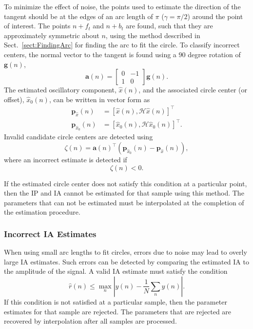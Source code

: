 \documentclass[a4paper]{IEEEtran}
\begin{document}
To minimize the effect of noise, the points used to estimate the direction of the tangent should be at the edges of an arc length of $\pi$ ($\gamma = \pi/2$) around the point of interest. The points $n+f_t$ and $n+b_t$ are found, such that they are approximately symmetric about $n$, using the method described in Sect.~\ref{sect:FindingArc} for finding the arc to fit the circle. To classify incorrect centers, the normal vector to the tangent is found using a $90$ degree rotation of $\mathbf{g}(n)$,
\begin{equation}
	\mathbf{a}\left(n\right) = \left[\begin{array}{cc}
	0 & -1 \\
	1 & 0\end{array}\right]\mathbf{g}(n).
\end{equation}
The estimated oscillatory component, $\hat{x}(n)$, and the associated circle center (or offset), $\hat{x}_0(n)$, can be written in vector form as
\begin{align}
	\mathbf{p}_{\hat{x}}(n) &= \left[\hat{x}\left(n\right),\mathcal{H}\hat{x}\left(n\right)\right]^{\top} \\ 
	\mathbf{p}_{\hat{x}_0}\left(n\right) &= \left[\hat{x}_0\left(n\right), \mathcal{H}\hat{x}_0\left(n\right)\right]^{\top}. 
\end{align}
Invalid candidate circle centers are detected using 
\begin{equation}
    \zeta(n) = \mathbf{a}\left( n\right)^{\top}\left( \mathbf{p}_{\hat{x}_0}\left( n \right) - \mathbf{p}_{\hat{x}}\left( n\right) \right),
\end{equation}
where an incorrect estimate is detected if
\begin{equation}\label{eq:IncorrectSideClassifier}
    \zeta(n) < 0.
\end{equation} 

If the estimated circle center does not satisfy this condition at a particular point, then the IP and IA cannot be estimated for that sample using this method. The parameters that can not be estimated must be interpolated at the completion of the estimation procedure. 

\subsubsection{Incorrect IA Estimates}
When using small arc lengths to fit circles, errors due to noise may lead to overly large IA estimates. Such errors can be detected by comparing the estimated IA to the amplitude of the signal. A valid IA estimate must satisfy the condition
\begin{equation}\label{eq:bound_on_IA_estimate}
	\hat{r}(n) \leq \max_n\left|y(n)-\frac{1}{N}\sum_ny(n)\right|.
\end{equation}
If this condition is not satisfied at a particular sample, then the parameter estimates for that sample are rejected. The parameters that are rejected are recovered by interpolation after all samples are processed.   
\end{document}

